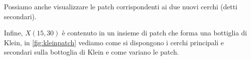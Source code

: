 Possiamo anche visualizzare le patch corrispondenti ai due nuovi cerchi (detti secondari).


Infine, $X(15,30)$ è contenuto in un insieme di patch che forma una bottiglia di Klein, in \cref{fig:kleinpatch} vediamo come si dispongono i cerchi principali e secondari sulla bottoglia di Klein e come variano le patch.

